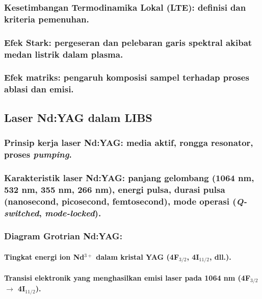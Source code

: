 \subsubsection{Kesetimbangan Termodinamika Lokal (LTE): definisi dan kriteria pemenuhan.}
\subsubsection{Efek Stark: pergeseran dan pelebaran garis spektral akibat medan listrik dalam plasma.}
\subsubsection{Efek matriks: pengaruh komposisi sampel terhadap proses ablasi dan emisi.}


\subsection{Laser Nd:YAG dalam LIBS}

\subsubsection{Prinsip kerja laser Nd:YAG: media aktif, rongga resonator, proses \textit{pumping}.}
\subsubsection{Karakteristik laser Nd:YAG: panjang gelombang (1064 nm, 532 nm, 355 nm, 266 nm), energi pulsa, durasi pulsa (nanosecond, picosecond, femtosecond), mode operasi (\textit{Q-switched}, \textit{mode-locked}).}

\subsubsection{Diagram Grotrian Nd:YAG:}


\paragraph{Tingkat energi ion Nd$^{3+}$ dalam kristal YAG (4F$_{3/2}$, 4I$_{11/2}$, dll.).}
\paragraph{Transisi elektronik yang menghasilkan emisi laser pada 1064 nm (4F$_{3/2}$ $\rightarrow$ 4I$_{11/2}$).}
